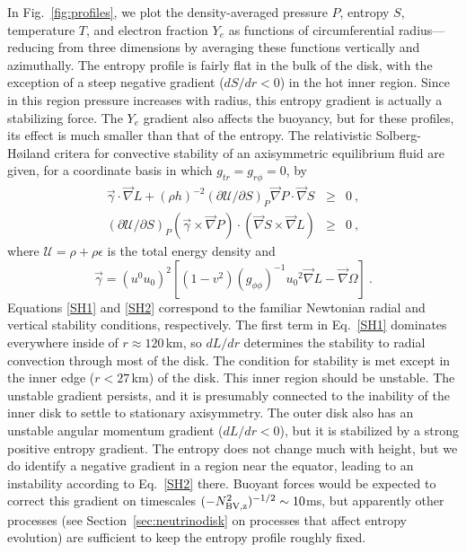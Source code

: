 In Fig.~\ref{fig:profiles}, we plot the density-averaged pressure $P$,
entropy $S$, temperature $T$, and electron fraction $Y_e$ as functions
of circumferential radius---reducing from three dimensions by averaging
these functions vertically and azimuthally.
The entropy profile is fairly flat in
the bulk of the disk, with the exception of a steep negative gradient
($dS/dr<0$) 
in the hot inner region.  Since in this region pressure increases with
radius, this entropy gradient is actually a stabilizing force.  The $Y_e$
gradient also affects the
buoyancy,
but for these profiles,
its effect is much smaller than that of the entropy.  The relativistic
Solberg-H{\o}iland critera for convective stability of an axisymmetric
equilibrium fluid are given, for a coordinate basis in which
$g_{tr}=g_{r\phi}=0$, by \citep{segu1975-rot_stability}
\begin{eqnarray}
\label{SH1}
\vec{\gamma}\cdot\vec{\nabla} L + (\rho h)^{-2}(\partial\mathcal{U}/\partial S)_P
\vec{\nabla} P\cdot\vec{\nabla} S &\ge& 0\ , \\
\label{SH2}
(\partial\mathcal{U}/\partial S)_P(\vec{\gamma}\times\vec{\nabla}P)\cdot
(\vec{\nabla}S\times\vec{\nabla}L) &\ge& 0\ ,
\end{eqnarray}
where $\mathcal{U}=\rho+\rho\epsilon$ is the total energy density and
\begin{equation}
\vec{\gamma} = (u^0u_0)^2[(1-v^2)(g_{\phi\phi})^{-1}u_0{}^2\vec{\nabla}L
-\vec{\nabla}\Omega]\ .
\end{equation}
Equations \ref{SH1} and \ref{SH2} correspond to the familiar Newtonian
radial and vertical stability conditions, respectively. 
The first term in Eq.~\ref{SH1} dominates everywhere inside
of $r\approx 120$\,km, so $dL/dr$ determines the stability to radial convection
through most of the disk. 
The condition for stability is met except in the inner edge ($r<27$\,km)
of the disk.  This inner region should be unstable.  The unstable
gradient persists, and it is presumably connected to the inability
of the inner disk to settle to stationary axisymmetry.  The outer
disk also has an unstable angular momentum gradient ($dL/dr<0$), but
it is stabilized by a strong positive entropy gradient. 
The entropy does not change much with height, but we do
identify a negative gradient in a region near the equator, leading to
an instability according to Eq.~\ref{SH2} there.  Buoyant forces would be
expected
to correct this gradient on timescales $(-N_{\rm BV,z}^2)^{-1/2}\sim 10$ms, but
apparently other processes (see Section~\ref{sec:neutrinodisk} on processes
that affect entropy
evolution) are sufficient to keep the entropy profile roughly fixed.

